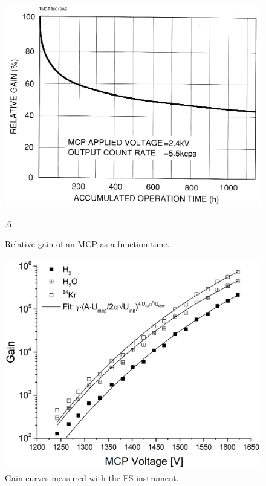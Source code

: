 	\begin{figure}[h] %
		\centering
		\includegraphics[width=.7\textwidth]{Experiments/MCP_relGain_timeevol.png}
		\caption{Relative gain of an MCP as a function time.} %
		\label{fig:MCPrelGainTime}.6
	\end{figure}
	\begin{figure}[h] %
		\centering
		\includegraphics[width=.7\textwidth]{Experiments/GainDetFSLabEl.png}
		\caption{Gain curves measured with the FS instrument.}
		\label{fig:MCPGainCurve4p7}
	\end{figure}
	
